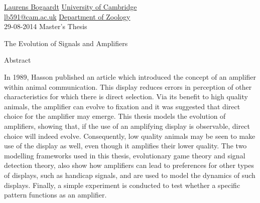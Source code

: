 \documentclass[a4paper,12pt]{article}
\numberwithin{equation}{section}
\begin{document}
\label{sec:Cover Page}
\thispagestyle{empty}

\href{http://www.bogaardtresearch.tk}{Laurens Bogaardt} \hfill \href{http://www.cam.ac.uk}{University of Cambridge}\\
\href{mailto:lb591@cam.ac.uk}{lb591@cam.ac.uk} \hfill \href{http://www.zoo.cam.ac.uk}{Department of Zoology}\\
\hfill 29-08-2014 \hfill Master's Thesis\\

\vspace{4cm}

\begin{center}
\begin{LARGE}
\begin{bf}
The Evolution of Signals and Amplifiers
\end{bf}
\end{LARGE}
\end{center}

\vspace{3.5cm}

\begin{center}
\begin{minipage}[t]{0.8\textwidth}
\begin{bf}
Abstract
\end{bf}
\vspace{.2cm}
\newline
In 1989, Hasson published an article which introduced the concept of an amplifier within animal communication. This display reduces errors in perception of other characteristics for which there is direct selection. Via its benefit to high quality animals, the amplifier can evolve to fixation and it was suggested that direct choice for the amplifier may emerge. This thesis models the evolution of amplifiers, showing that, if the use of an amplifying display is observable, direct choice will indeed evolve. Consequently, low quality animals may be seen to make use of the display as well, even though it amplifies their lower quality. The two modelling frameworks used in this thesis, evolutionary game theory and signal detection theory, also show how amplifiers can lead to preferences for other types of displays, such as handicap signals, and are used to model the dynamics of such displays. Finally, a simple experiment is conducted to test whether a specific pattern functions as an amplifier.
\end{minipage}
\end{center}
\end{document}
